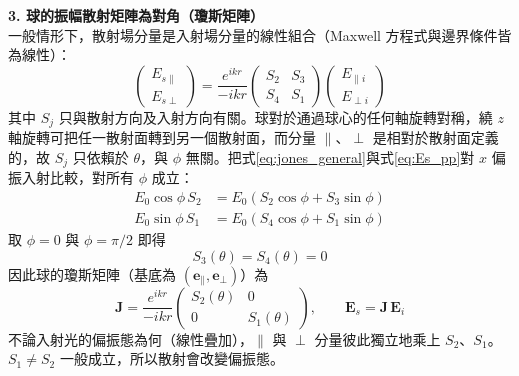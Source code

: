 \textbf{3. 球的振幅散射矩陣為對角（瓊斯矩陣）}\\
一般情形下，散射場分量是入射場分量的線性組合（Maxwell 方程式與邊界條件皆為線性）：
\begin{equation}
    \begin{pmatrix} E_{s\parallel} \\ E_{s\perp} \end{pmatrix} = \frac{e^{ikr}}{-ikr} \begin{pmatrix} S_2 & S_3 \\ S_4 & S_1 \end{pmatrix} \begin{pmatrix} E_{\parallel i} \\ E_{\perp i} \end{pmatrix} \label{eq:jones_general}
\end{equation}
其中 $S_j$ 只與散射方向及入射方向有關。球對於通過球心的任何軸旋轉對稱，繞 $z$ 軸旋轉可把任一散射面轉到另一個散射面，而分量 $\parallel$、$\perp$ 是相對於散射面定義的，故 $S_j$ 只依賴於 $\theta$，與 $\phi$ 無關。把式\eqref{eq:jones_general}與式\eqref{eq:Es_pp}對 $x$ 偏振入射比較，對所有 $\phi$ 成立：
\begin{align}
    E_0 \cos\phi\, S_2 &= E_0 \left( S_2 \cos\phi + S_3 \sin\phi \right) \\
    E_0 \sin\phi\, S_1 &= E_0 \left( S_4 \cos\phi + S_1 \sin\phi \right)
\end{align}
取 $\phi = 0$ 與 $\phi = \pi/2$ 即得
\begin{equation}
    S_3(\theta) = S_4(\theta) = 0
\end{equation}
因此球的瓊斯矩陣（基底為 $(\mathbf{e}_{\parallel}, \mathbf{e}_{\perp})$）為
\begin{equation}
    \mathbf{J} = \frac{e^{ikr}}{-ikr} \begin{pmatrix} S_2(\theta) & 0 \\ 0 & S_1(\theta) \end{pmatrix}, \qquad \mathbf{E}_s = \mathbf{J}\, \mathbf{E}_i \label{eq:jones}
\end{equation}
不論入射光的偏振態為何（線性疊加），$\parallel$ 與 $\perp$ 分量彼此獨立地乘上 $S_2$、$S_1$。$S_1 \neq S_2$ 一般成立，所以散射會改變偏振態。

